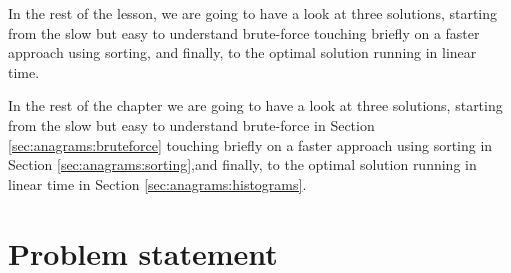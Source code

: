 In the rest of the lesson, we are going to have a look at three
solutions, starting from the slow but easy to understand brute-force touching briefly on a faster approach using sorting, and finally, to the optimal solution running in linear time. 

In the rest of the chapter we are going to have a look at three
solutions, starting from the slow but easy to understand brute-force in Section \ref{sec:anagrams:bruteforce} touching briefly on a faster approach using sorting
 in Section \ref{sec:anagrams:sorting},and finally, to the optimal solution running in linear time in Section
\ref{sec:anagrams:histograms}. 

\section{Problem statement}
